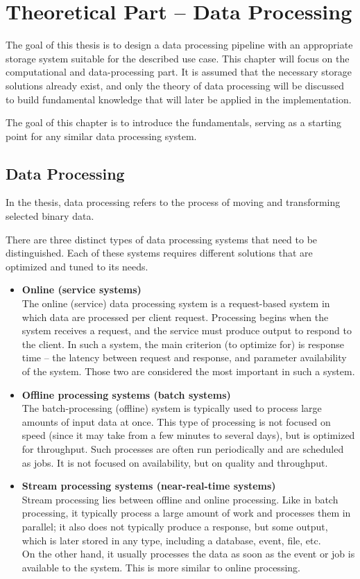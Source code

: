 \chapter{Theoretical Part -- Data Processing}\label{ch:data_processing}
The goal of this thesis is to design a data processing pipeline with an appropriate storage system suitable for the described use case. This chapter will focus on the computational and data-processing part. It is assumed that the necessary storage solutions already exist, and only the theory of data processing will be discussed to build fundamental knowledge that will later be applied in the implementation.

The goal of this chapter is to introduce the fundamentals, serving as a starting point for any similar data processing system.

\section{Data Processing}
In the thesis, data processing refers to the process of moving and transforming selected binary data.

There are three distinct types of data processing systems that need to be distinguished. Each of these systems requires different solutions that are optimized and tuned to its needs.
\begin{itemize}
    \item \textbf{Online (service systems)} \\
    The online (service) data processing system is a request-based system in which data are processed per client request. Processing begins when the system receives a request, and the service must produce output to respond to the client. In such a system, the main criterion (to optimize for) is response time -- the latency between request and response, and parameter availability of the system. Those two are considered the most important in such a system.
    \item \textbf{Offline processing systems (batch systems)} \\
    The batch-processing (offline) system is typically used to process large amounts of input data at once. This type of processing is not focused on speed (since it may take from a few minutes to several days), but is optimized for throughput. Such processes are often run periodically and are scheduled as jobs. It is not focused on availability, but on quality and throughput.
    \item \textbf{Stream processing systems (near-real-time systems)} \\
    Stream processing lies between offline and online processing. Like in batch processing, it typically process a large amount of work and processes them in parallel; it also does not typically produce a response, but some output, which is later stored in any type, including a database, event, file, etc. \\
    On the other hand, it usually processes the data as soon as the event or job is available to the system. This is more similar to online processing.
\end{itemize}\cite{kleppmann_designing_2017}

